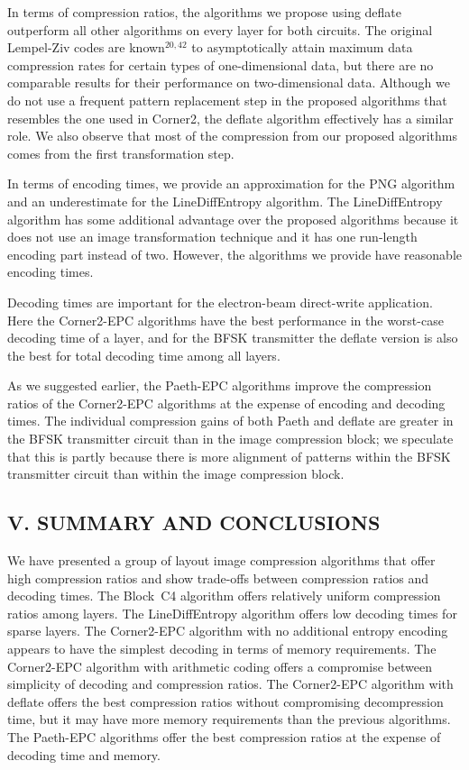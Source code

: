 \documentclass{article}
\begin{document}
In terms of compression ratios, the algorithms we propose using deflate
outperform all other algorithms on every layer for both circuits.
The original Lempel-Ziv codes are known$^{20,42}$ to 
asymptotically attain maximum data
compression rates for certain types of one-dimensional data, but there are
no comparable results for their performance on two-dimensional data.
Although we do not use a frequent pattern replacement step in the proposed
algorithms that resembles the one used in Corner2, the deflate algorithm
effectively has a similar role.  We also observe that most of the compression
from our proposed algorithms comes from the first transformation step.

In terms of encoding times, we provide an approximation for the PNG algorithm
and an underestimate for the LineDiffEntropy algorithm.  
The LineDiffEntropy algorithm has some
additional advantage over the proposed algorithms because it does not use
an image transformation technique and it has one run-length encoding part
instead of two.  However, the algorithms we provide have reasonable
encoding times.

Decoding times are important for the electron-beam direct-write application.
Here the Corner2-EPC algorithms have the best performance in the worst-case
decoding time of a layer, and for the BFSK transmitter the deflate version
is also the best for total decoding time among all layers.

As we suggested earlier, the Paeth-EPC algorithms improve the compression
ratios of the Corner2-EPC algorithms at the expense of encoding and decoding
times.  The individual compression gains of both Paeth and deflate are 
greater in the BFSK transmitter circuit than in the image compression block;
we speculate that this is partly because there is more alignment of patterns 
within the BFSK transmitter circuit than within the image compression block.


\subsection*{V. SUMMARY AND CONCLUSIONS}
We have presented a group of layout image compression algorithms that offer
high compression ratios and show trade-offs between compression ratios
and decoding times.  The Block~C4 algorithm offers relatively uniform
compression ratios among layers.  The LineDiffEntropy algorithm offers
low decoding times for sparse layers.  The Corner2-EPC algorithm with no
additional entropy encoding appears to have the simplest decoding in terms
of memory requirements.  The Corner2-EPC algorithm with arithmetic coding
offers a compromise between simplicity of decoding and compression ratios.
The Corner2-EPC algorithm with deflate offers the best compression ratios
without compromising decompression time, but it may have more memory 
requirements than the previous algorithms.  The Paeth-EPC algorithms offer
the best compression ratios at the expense of decoding time and memory.
\end{document}
